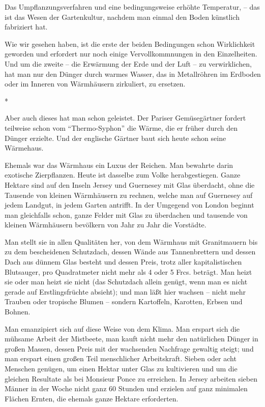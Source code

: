 \documentclass{scrbook}
\begin{document}
Das Umpflanzungsverfahren und eine bedingungsweise erhöhte Temperatur, – das ist das Wesen der Gartenkultur, nachdem man einmal den Boden künstlich fabriziert hat.

Wie wir gesehen haben, ist die erste der beiden Bedingungen schon Wirklichkeit geworden und erfordert nur noch einige Vervollkommnungen in den Einzelheiten. Und um die zweite – die Erwärmung der Erde und der Luft – zu verwirklichen, hat man nur den Dünger durch warmes Wasser, das in Metallröhren im Erdboden oder im Inneren von Wärmhäusern zirkuliert, zu ersetzen.

\begin{center}*\end{center}

Aber auch dieses hat man schon geleistet. Der Pariser Gemüsegärtner fordert teilweise schon vom ``Thermo-Syphon'' die Wärme, die er früher durch den Dünger erzielte. Und der englische Gärtner baut sich heute schon seine Wärmehaus.

Ehemals war das Wärmhaus ein Luxus der Reichen. Man bewahrte darin exotische Zierpflanzen. Heute ist dasselbe zum Volke herabgestiegen. Ganze Hektare sind auf den Inseln Jersey und Guernesey mit Glas überdacht, ohne die Tausende von kleinen Wärmhäusern zu rechnen, welche man auf Guernesey auf jedem Landgut, in jedem Garten antrifft. In der Umgegend von London beginnt man gleichfalls schon, ganze Felder mit Glas zu überdachen und tausende von kleinen Wärmhäusern bevölkern von Jahr zu Jahr die Vorstädte.

Man stellt sie in allen Qualitäten her, von dem Wärmhaus mit Granitmauern bis zu dem bescheidenen Schutzdach, dessen Wände aus Tannenbrettern und dessen Dach aus dünnem Glas besteht und dessen Preis, trotz aller kapitalistischen Blutsauger, pro Quadratmeter nicht mehr als 4 oder 5 Frcs. beträgt. Man heizt sie oder man heizt sie nicht (das Schutzdach allein genügt, wenn man es nicht gerade auf Erstlingsfrüchte absieht); und man läßt hier wachsen – nicht mehr Trauben oder tropische Blumen – sondern Kartoffeln, Karotten, Erbsen und Bohnen.

Man emanzipiert sich auf diese Weise von dem Klima. Man erspart sich die mühsame Arbeit der Mistbeete, man kauft nicht mehr den natürlichen Dünger in großen Massen, dessen Preis mit der wachsenden Nachfrage gewaltig steigt; und man erspart einen großen Teil menschlicher Arbeitskraft. Sieben oder acht Menschen genügen, um einen Hektar unter Glas zu kultivieren und um die gleichen Resultate als bei Monsieur Ponce zu erreichen. In Jersey arbeiten sieben Männer in der Woche nicht ganz 60 Stunden und erzielen auf ganz minimalen Flächen Ernten, die ehemals ganze Hektare erforderten.
\end{document}
